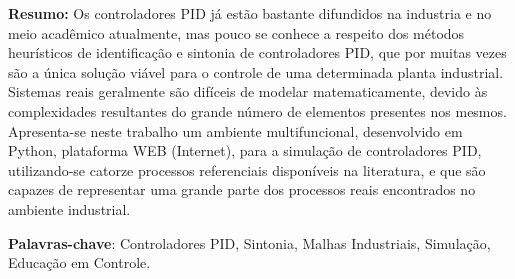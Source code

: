 \begin{resumo}

    \textbf{Resumo:} Os controladores \acs{PID} já estão bastante difundidos na industria e no
    meio acadêmico atualmente, mas pouco se conhece a respeito dos métodos
    heurísticos de identificação e sintonia de controladores \acs{PID},
    que por muitas vezes são a única solução viável para o controle de
    uma determinada planta industrial. Sistemas reais geralmente são difíceis
    de modelar matematicamente, devido às complexidades resultantes do
    grande número de elementos presentes nos mesmos. Apresenta-se
    neste trabalho um ambiente multifuncional, desenvolvido em Python,
    plataforma WEB (Internet), para a simulação de controladores \acs{PID},
    utilizando-se catorze processos referenciais disponíveis na literatura, e
    que são capazes de representar uma grande parte dos processos reais
    encontrados no ambiente industrial.
    
    \textbf{Palavras-chave}: Controladores PID, Sintonia, Malhas Industriais,
    Simulação, Educação em Controle.

\end{resumo}

